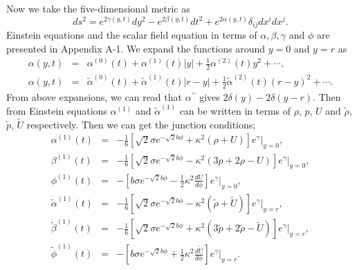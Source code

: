 \documentclass[a4paper,11pt]{article}
\begin{document}
Now we take the five-dimensional metric as 
\begin{equation}
ds^2 = e^{2\gamma(y, t)}dy^2 -e^{2\beta(y,t )}dt^2 
            +e^{2\alpha(y, t)}\delta_{ij}dx^i dx^j. 
\end{equation}
Einstein equations and the scalar field equation in terms of 
$\alpha, \beta, \gamma$ and $\phi$ are presented in 
Appendix A-1. We expand the functions around $y=0$ and $y=r$ as    
\begin{eqnarray}
\alpha(y,t) &=& \alpha^{(0)}(t)+ \alpha^{(1)}(t)|y|
               +\frac{1}{2}\alpha^{(2)}(t)y^2 + \cdots 
\label{eq:around_0}, \\
\alpha(y,t) &=& \tilde{\alpha}^{(0)}(t)
                     + \tilde{\alpha}^{(1)}(t)|r-y|
                 + \frac{1}{2}\tilde{\alpha}^{(2)}(t)(r-y)^2 + \cdots. 
\label{eq:around_r}  
\end{eqnarray}
From above expansions, we can read that 
$\alpha^{\prime\prime}$ gives $2\delta(y)-2\delta(y-r)$. Then 
from Einstein equations 
$\alpha^{(1)}$ and $\tilde{\alpha}^{(1)}$ 
can be written in terms of $\rho$, $p$, $U$ and $\tilde{\rho}$, 
$\tilde{p}$, $\tilde{U}$ respectively. Then we can get the junction conditions; 
\begin{eqnarray}
\alpha^{(1)}(t) &=& 
-\frac{1}{6}
 \left[
  \sqrt{2} \sigma e^{-\sqrt{2}b \phi} 
  + \kappa^2 (\rho + U )
 \right]
 e^{\gamma} \bigg|_{y=0},  \\
\beta^{(1)}(t) &=& 
-\frac{1}{6}
 \left[
  \sqrt{2}\sigma e^{-\sqrt{2}b \phi} 
  - \kappa^2 (3p +2\rho - U )
 \right]
 e^{\gamma} \bigg|_{y=0},  \\
\phi^{(1)}(t) &=& 
-\left[
  b \sigma e^{-\sqrt{2}b \phi} 
  - \frac{1}{2} \kappa^2 \frac{dU}{d\phi}
 \right]
 e^{\gamma} \bigg|_{y=0},  \\
\tilde{\alpha}^{(1)}(t) &=& 
-\frac{1}{6}
 \left[
  \sqrt{2} \sigma e^{-\sqrt{2}b \phi} 
  - \kappa^2 (\tilde{\rho} + \tilde{U} )
 \right]
 e^{\gamma} \bigg|_{y=r},  \\
\tilde{\beta}^{(1)}(t) &=& 
-\frac{1}{6}
 \left[
  \sqrt{2} \sigma e^{-\sqrt{2}b \phi} 
  + \kappa^2 (3 \tilde{p} +2 \tilde{\rho} - \tilde{U} )
 \right]
 e^{\gamma} \bigg|_{y=r},  \\
\tilde{\phi}^{(1)}(t) &=& 
-\left[
  b \sigma e^{-\sqrt{2}b \phi} 
  + \frac{1}{2} \kappa^2 \frac{d \tilde{U}}{d\phi}
 \right]
 e^{\gamma} \bigg|_{y=r}.
\end{eqnarray}
\end{document}
